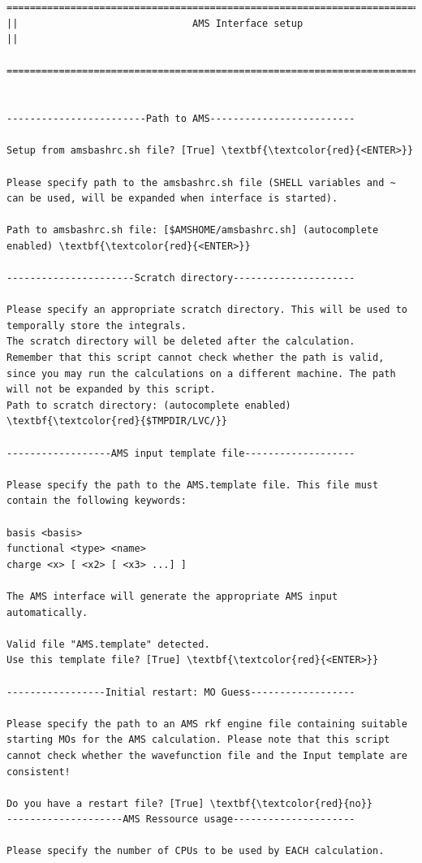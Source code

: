 \documentclass[a4paper,11pt,DIV=15,openany]{scrbook}
\begin{document}
\begin{oframed}
\begin{Verbatim}[commandchars=\\\{\}]
================================================================================
||                              AMS Interface setup                               ||
  ================================================================================


------------------------Path to AMS-------------------------

Setup from amsbashrc.sh file? [True] \textbf{\textcolor{red}{<ENTER>}}

Please specify path to the amsbashrc.sh file (SHELL variables and ~ can be used, will be expanded when interface is started).

Path to amsbashrc.sh file: [$AMSHOME/amsbashrc.sh] (autocomplete enabled) \textbf{\textcolor{red}{<ENTER>}}

----------------------Scratch directory---------------------

Please specify an appropriate scratch directory. This will be used to temporally store the integrals. 
The scratch directory will be deleted after the calculation. 
Remember that this script cannot check whether the path is valid, 
since you may run the calculations on a different machine. The path will not be expanded by this script.
Path to scratch directory: (autocomplete enabled) \textbf{\textcolor{red}{$TMPDIR/LVC/}}

------------------AMS input template file-------------------

Please specify the path to the AMS.template file. This file must contain the following keywords:

basis <basis>
functional <type> <name>
charge <x> [ <x2> [ <x3> ...] ]

The AMS interface will generate the appropriate AMS input automatically.

Valid file "AMS.template" detected. 
Use this template file? [True] \textbf{\textcolor{red}{<ENTER>}}

-----------------Initial restart: MO Guess------------------

Please specify the path to an AMS rkf engine file containing suitable starting MOs for the AMS calculation. Please note that this script cannot check whether the wavefunction file and the Input template are consistent!

Do you have a restart file? [True] \textbf{\textcolor{red}{no}}
--------------------AMS Ressource usage---------------------

Please specify the number of CPUs to be used by EACH calculation.


\end{Verbatim}
\end{oframed}
\end{document}
